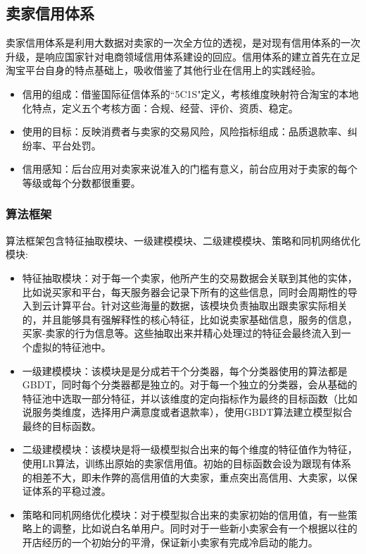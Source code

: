 \subsection{卖家信用体系}
卖家信用体系是利用大数据对卖家的一次全方位的透视，是对现有信用体系的一次升级，是响应国家针对电商领域信用体系建设的回应\cite{gov_credit}。信用体系的建立首先在立足淘宝平台自身的特点基础上，吸收借鉴了其他行业在信用上的实践经验。
\begin{itemize}
\item
信用的组成：借鉴国际征信体系的“5C1S"定义，考核维度映射符合淘宝的本地化特点，定义五个考核方面：合规、经营、评价、资质、稳定。
\item
使用的目标：反映消费者与卖家的交易风险，风险指标组成：品质退款率、纠纷率、平台处罚。
\item
信用感知：后台应用对卖家来说准入的门槛有意义，前台应用对于卖家的每个等级或每个分数都很重要。
\end{itemize}

\subsubsection{算法框架}

算法框架包含特征抽取模块、一级建模模块、二级建模模块、策略和同机网络优化模块:
\begin{itemize}
\item
特征抽取模块：对于每一个卖家，他所产生的交易数据会关联到其他的实体，比如说买家和平台，每天服务器会记录下所有的这些信息，同时会周期性的导入到云计算平台。针对这些海量的数据，该模块负责抽取出跟卖家实际相关的，并且能够具有强解释性的核心特征，比如说卖家基础信息，服务的信息，买家-卖家的行为信息等。这些抽取出来并精心处理过的特征会最终流入到一个虚拟的特征池中。
\item
一级建模模块：该模块是是分成若干个分类器，每个分类器使用的算法都是GBDT，同时每个分类器都是独立的。对于每一个独立的分类器，会从基础的特征池中选取一部分特征，并以该维度的定向指标作为最终的目标函数（比如说服务类维度，选择用户满意度或者退款率），使用GBDT算法建立模型拟合最终的目标函数。
\item
二级建模模块：该模块是将一级模型拟合出来的每个维度的特征值作为特征，使用LR算法，训练出原始的卖家信用值。初始的目标函数会设为跟现有体系的相差不大，即未作弊的高信用值的大卖家，重点突出高信用、大卖家，以保证体系的平稳过渡。
\item
策略和同机网络优化模块：对于模型拟合出来的卖家初始的信用值，有一些策略上的调整，比如说白名单用户。同时对于一些新小卖家会有一个根据以往的开店经历的一个初始分的平滑，保证新小卖家有完成冷启动的能力。
\end{itemize}

